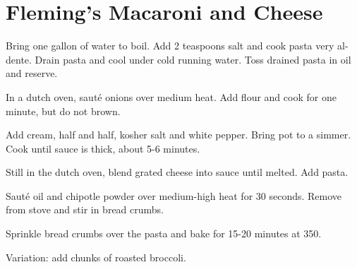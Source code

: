 
\section{Fleming's Macaroni and Cheese}
\begin{recipe}



Bring one gallon of water to boil. Add 2 teaspoons salt and cook pasta very al-dente. Drain pasta and cool under cold running water. Toss drained pasta in oil and reserve.


In a dutch oven, sauté onions over medium heat. Add flour and cook for one minute, but do not brown.


Add cream, half and half, kosher salt and white pepper. Bring pot to a simmer. Cook until sauce is thick, about 5-6 minutes.


Still in the dutch oven, blend grated cheese into sauce until melted. Add pasta.


Sauté oil and chipotle powder over medium-high heat for 30 seconds. Remove from stove and stir in bread crumbs.

Sprinkle bread crumbs over the pasta and bake for 15-20 minutes at 350\degree.

Variation: add chunks of roasted broccoli.

\end{recipe}
